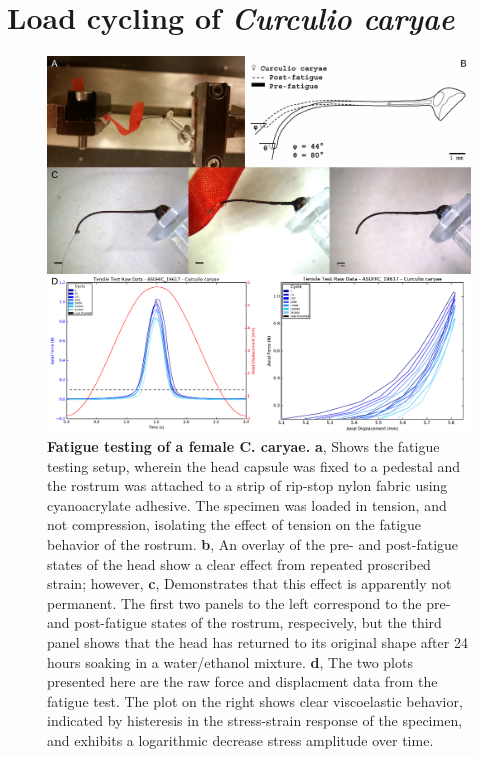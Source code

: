 \documentclass[twocolumn, linenumbers, superscriptaddress, nofootinbib]{revtex4-1}
\begin{document}
	\section{Load cycling of \textit{Curculio caryae}}
		
		\begin{figure}
			\centering
			\includegraphics[width=180mm]{fig5.pdf}
			\caption{\textbf{Fatigue testing of a female C. caryae.}
				\textbf{a}, Shows the fatigue testing setup, wherein the head capsule was fixed to a pedestal and the rostrum was attached to a strip of rip-stop nylon fabric using cyanoacrylate adhesive.
				The specimen was loaded in tension, and not compression, isolating the effect of tension on the fatigue behavior of the rostrum.
				\textbf{b}, An overlay of the pre- and post-fatigue states of the head show a clear effect from repeated proscribed strain; however,
				\textbf{c}, Demonstrates that this effect is apparently not permanent.
			The first two panels to the left correspond to the pre- and post-fatigue states of the rostrum, respecively, but the third panel shows that the head has returned to its original shape after 24 hours soaking in a water/ethanol mixture.
				\textbf{d}, The two plots presented here are the raw force and displacment data from the fatigue test.
				The plot on the right shows clear viscoelastic behavior, indicated by histeresis in the stress-strain response of the specimen, and exhibits a logarithmic decrease stress amplitude over time.
			}
			\label{fig::fatigue}
		\end{figure}
		
\end{document}
